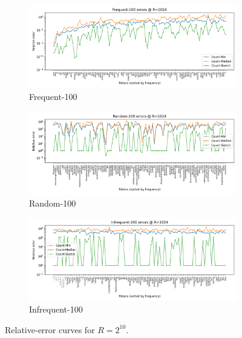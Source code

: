 \documentclass[11pt]{article}
\begin{document}
\begin{figure}[H]
  \centering
  \begin{subfigure}[t]{0.32\linewidth}
    \centering
    \includegraphics[width=\linewidth]{../outputs/a2/errors_R1024_Frequent_100.png}
    \caption{Frequent-100}
  \end{subfigure}\hfill
  \begin{subfigure}[t]{0.32\linewidth}
    \centering
    \includegraphics[width=\linewidth]{../outputs/a2/errors_R1024_Random_100.png}
    \caption{Random-100}
  \end{subfigure}\hfill
  \begin{subfigure}[t]{0.32\linewidth}
    \centering
    \includegraphics[width=\linewidth]{../outputs/a2/errors_R1024_Infrequent_100.png}
    \caption{Infrequent-100}
  \end{subfigure}
  \caption{Relative-error curves for $R=2^{10}$.}
  \label{fig:error-r1024}
\end{figure}
\end{document}
